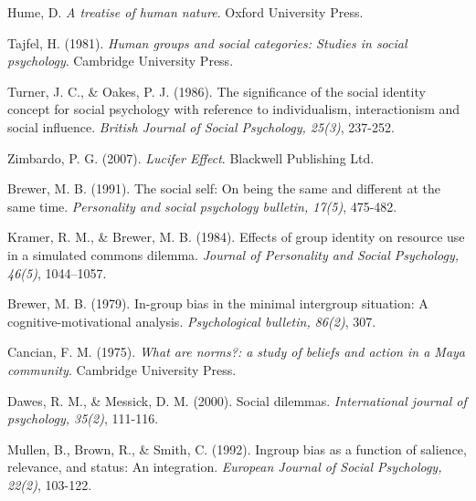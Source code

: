 \documentclass[rutwik_proposal.tex]{subfiles}
\begin{document}
\begin{thebibliography}{100}
Hume, D.
\emph{A treatise of human nature}.
Oxford University Press.

Tajfel, H. 
(1981). 
\emph{Human groups and social categories: Studies in social psychology}. 
Cambridge University Press.

Turner, J. C., \& Oakes, P. J. 
(1986). 
The significance of the social identity concept for social psychology with reference to individualism, interactionism and social influence. 
\emph{British Journal of Social Psychology, 25(3)}, 
237-252.

Zimbardo, P. G. 
(2007). 
\emph{Lucifer Effect}. 
Blackwell Publishing Ltd.

Brewer, M. B. 
(1991). 
The social self: On being the same and different at the same time. 
\emph{Personality and social psychology bulletin, 17(5)}, 
475-482.

Kramer, R. M., \& Brewer, M. B. 
(1984). 
Effects of group identity on resource use in a simulated commons dilemma. 
\emph{Journal of Personality and Social Psychology, 46(5)}, 
1044–1057.

Brewer, M. B. 
(1979). 
In-group bias in the minimal intergroup situation: A cognitive-motivational analysis. 
\emph{Psychological bulletin, 86(2)}, 
307.

Cancian, F. M. 
(1975). 
\emph{What are norms?: a study of beliefs and action in a Maya community}. 
Cambridge University Press.

Dawes, R. M., \& Messick, D. M. 
(2000). 
Social dilemmas. 
\emph{International journal of psychology, 35(2)}, 
111-116.

Mullen, B., Brown, R., \& Smith, C. 
(1992). 
Ingroup bias as a function of salience, relevance, and status: An integration. 
\emph{European Journal of Social Psychology, 22(2)}, 
103-122.

\end{thebibliography}
\end{document}
